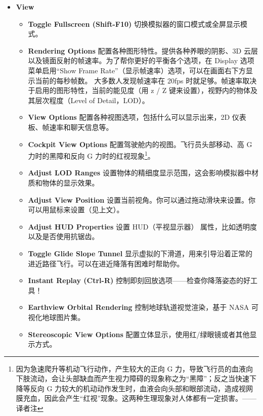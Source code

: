 \begin{itemize}
\ifchinese
 \item \textbf{View}
 \begin{itemize}
  \item \textbf{Toggle Fullscreen (Shift-F10)} 切换模拟器的窗口模式或全屏显示模式。
  \item \textbf{Rendering Options} 配置各种图形特性。提供各种养眼的阴影、3D 云层以及镜面反射的帧速率。为了帮你更好的平衡各个选项，在 Display 选项菜单启用``Show Frame Rate''（显示帧速率）选项，可以在画面右下方显示当前的每秒帧数。
  大多数人发现帧速率在 20fps 时就足够。帧速率取决于启用的图形特性，当前的能见度（用 z / Z 键来设置），视野内的物体及其层次程度（Level of Detail，LOD）。
  \item \textbf{View Options} 配置各种视图选项，包括什么可以显示出来，2D 仪表板、帧速率和聊天信息等。
  \item \textbf{Cockpit View Options} 配置驾驶舱内的视图。飞行员头部移动、高 G 力时的黑障和反向 G 力时的红视现象\footnote{因为急速爬升等机动飞行动作，产生较大的正向 G 力，导致飞行员的血液向下肢流动，会让头部缺血而产生视力障碍的现象称之为“黑障”；反之当快速下降等反向 G 力较大的机动动作发生时，血液会向头部和眼部流动，造成视网膜充血，因此会产生“红视”现象。这两种生理现象对人体都有一定损害。——译者注}。
  \item \textbf{Adjust LOD Ranges} 设置物体的精细度显示范围，这会影响模拟器中材质和物体的显示效果。
  \item \textbf{Adjust View Position} 设置当前视角。你可以通过拖动滑块来设置。你可以用鼠标来设置（见上文）。
  \item \textbf{Adjust HUD Properties} 设置 HUD（平视显示器） 属性，比如透明度以及是否使用抗锯齿。
  \item \textbf{Toggle Glide Slope Tunnel} 显示虚拟的下滑道，用来引导沿着正常的进近路径飞行。可以在进近降落有困难时帮助你。
  \item \textbf{Instant Replay (Ctrl-R)} 控制即刻回放选项——检查你降落姿态的好工具！
  \item \textbf{Earthview Orbital Rendering} 控制地球轨道视觉渲染，基于 NASA 可视化地球图片集。
  \item \textbf{Stereoscopic View Options} 配置立体显示，使用红/绿眼镜或者其他显示方式。
 \end{itemize}  
\fi
\iffalse
{}
\end{itemize}
